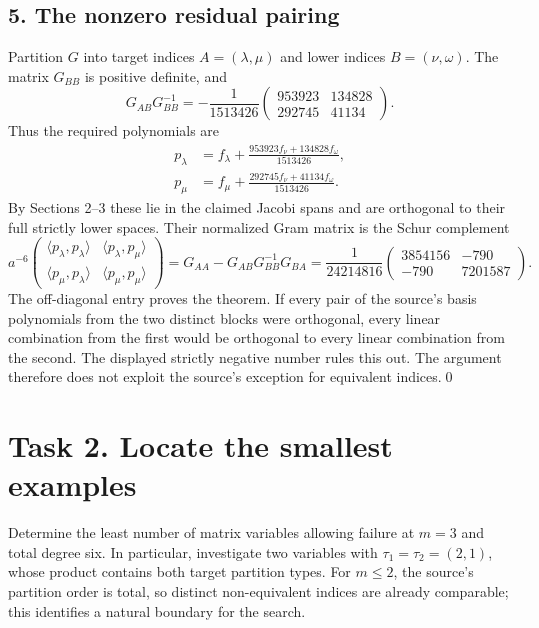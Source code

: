 \documentclass[11pt]{article}
\newcommand{\ip}[2]{\langle #1,#2\rangle}
\begin{document}
\subsection*{5. The nonzero residual pairing}
Partition $G$ into target indices $A=(\lambda,\mu)$ and lower indices
$B=(\nu,\omega)$. The matrix $G_{BB}$ is positive definite, and
\[
 G_{AB}G_{BB}^{-1}
 =-\frac1{1513426}
     \begin{pmatrix}953923&134828\\292745&41134\end{pmatrix}.
\]
Thus the required polynomials are
\begin{align*}
 p_\lambda&=f_\lambda+
          \frac{953923 f_\nu+134828 f_\omega}{1513426},\\
 p_\mu&=f_\mu+
          \frac{292745 f_\nu+41134 f_\omega}{1513426}.
\end{align*}
By Sections 2--3 these lie in the claimed Jacobi spans and are
orthogonal to their full strictly lower spaces. Their normalized
Gram matrix is the Schur complement
\[
 a^{-6}\begin{pmatrix}
 \ip{p_\lambda}{p_\lambda}&\ip{p_\lambda}{p_\mu}\\
 \ip{p_\mu}{p_\lambda}&\ip{p_\mu}{p_\mu}
 \end{pmatrix}
 =G_{AA}-G_{AB}G_{BB}^{-1}G_{BA}
 =\frac1{24214816}
       \begin{pmatrix}3854156&-790\\-790&7201587\end{pmatrix}.
\]
The off-diagonal entry proves the theorem. If every pair of the
source's basis polynomials from the two distinct blocks were
orthogonal, every linear combination from the first would be
orthogonal to every linear combination from the second. The displayed
strictly negative number rules this out. The argument therefore does
not exploit the source's exception for equivalent indices.\qed

\section*{Task 2. Locate the smallest examples}
Determine the least number of matrix variables allowing failure at
$m=3$ and total degree six. In particular, investigate two variables
with $\tau_1=\tau_2=(2,1)$, whose product contains both target partition
types. For $m\le2$, the source's partition order is total, so distinct
non-equivalent indices are already comparable; this identifies a
natural boundary for the search.
\end{document}
